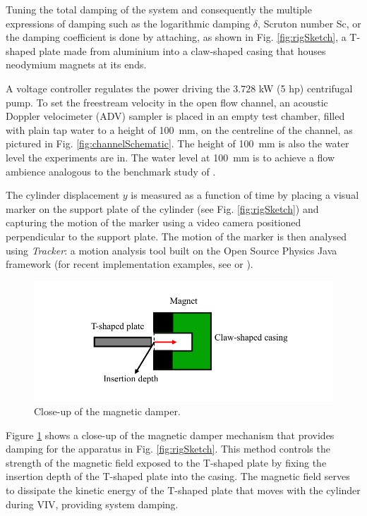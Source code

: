 \documentclass[oneside]{utmthesis}
\begin{document}
Tuning the total damping of the system and consequently the multiple expressions of damping such as the logarithmic damping $\delta$, Scruton number Sc, or the damping coefficient is done by attaching, as shown in Fig. \ref{fig:rigSketch}, a T-shaped plate made from aluminium into a claw-shaped casing that houses neodymium magnets at its ends.

A voltage controller regulates the power driving the $3.728$ kW (5 hp) centrifugal pump. To set the freestream velocity in the open flow channel, an acoustic Doppler velocimeter (ADV) sampler is placed in an empty test chamber, filled with plain tap water to a height of \SI{100}{\milli\metre}, on the centreline of the channel, as pictured in Fig. \ref{fig:channelSchematic}. The height of \SI{100}{\milli\metre} is also the water level the experiments are in. The water level at \SI{100}{\milli\metre} is to achieve a flow ambience analogous to the benchmark study of \citet{Koide2013}.

The cylinder displacement $y$ is measured as a function of time by placing a visual marker on the support plate of the cylinder (see Fig. \ref{fig:rigSketch}) and capturing the motion of the marker using a video camera positioned perpendicular to the support plate. The motion of the marker is then analysed using \textit{Tracker}: a motion analysis tool built on the Open Source Physics Java framework (for recent implementation examples, see \citet{Wen2020}  or \citet{Krishnendu2020}).

\begin{figure}[!h]
  \centering
  \includegraphics[width=1\textwidth]{figs/damperSketch}
  \caption{Close-up of the magnetic damper.}
  \label{fig:damperSketch}
\end{figure}

Figure \ref{fig:damperSketch} shows a close-up of the magnetic damper mechanism that provides damping for the apparatus in Fig. \ref{fig:rigSketch}. This method controls the strength of the magnetic field exposed to the T-shaped plate by fixing the insertion depth of the T-shaped plate into the casing. The magnetic field serves to dissipate the kinetic energy of the T-shaped plate that moves with the cylinder during VIV, providing system damping.
\end{document}
